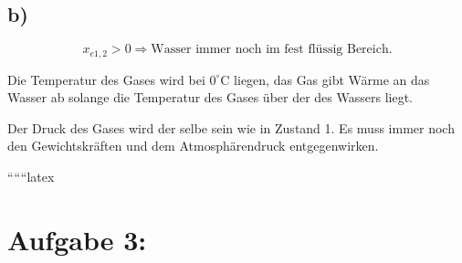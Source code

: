 

\subsection*{b)}

\[
x_{e1,2} > 0 \Rightarrow \text{Wasser immer noch im fest flüssig Bereich.}
\]

Die Temperatur des Gases wird bei \(0^\circ \text{C}\) liegen, das Gas gibt Wärme an das Wasser ab solange die Temperatur des Gases über der des Wassers liegt.

Der Druck des Gases wird der selbe sein wie in Zustand 1. Es muss immer noch den Gewichtskräften und dem Atmosphärendruck entgegenwirken.

``````latex


\section*{Aufgabe 3:}